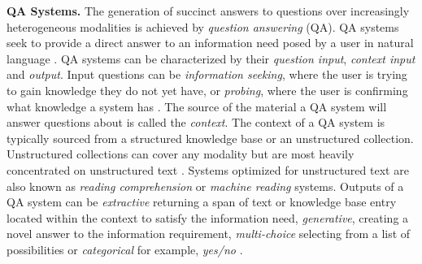 \documentclass[11pt]{article}
\newcommand{\pinaforecomment}[3]{\colorbox{#1}{\parbox{.8\linewidth}{#2: #3}}}
\newcommand{\pinaforecomment}[3]{}
\newcommand{\jbgcomment}[1]{\pinaforecomment{red}{JBG}{#1}}
\begin{document}
\textbf{QA Systems.} The generation of succinct answers to questions over increasingly heterogeneous modalities is achieved by \textit{question answering} (QA). 
QA systems seek to provide a direct answer to an information need posed by a user in natural language \cite{Roy2021}. QA systems can be characterized by their \textit{question input}, \textit{context input} and \textit{output}. Input questions can be \textit{information seeking}, where the user is trying to gain knowledge they do not yet have, or \textit{probing}, where the user is confirming what knowledge a system has \cite{Rogers2023}. The source of the material a QA system will answer questions about is called the \textit{context}. The context of a QA system is typically sourced from a structured knowledge base or an unstructured collection. Unstructured collections can cover any modality but are most heavily concentrated on unstructured text \cite{Roy2021}. Systems optimized for unstructured text are also known as \textit{reading comprehension} or \textit{machine reading} systems. Outputs of a QA system can be \textit{extractive} returning a span of text or knowledge base entry located within the context to satisfy the information need, \textit{generative}, creating a novel answer to the information requirement, \textit{multi-choice} selecting from a list of possibilities or \textit{categorical} for example, \textit{yes/no}  \cite{Rogers2023}.

\end{document}
